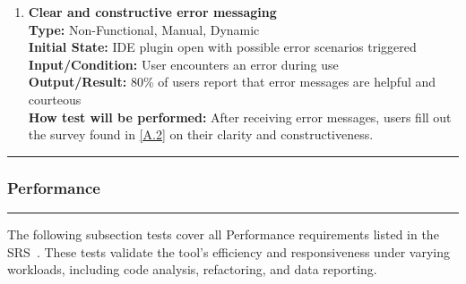 \documentclass[12pt, titlepage]{article}
\newcommand{\colorrule}{\textcolor{BlueViolet}{\rule{\linewidth}{2pt}}}
\begin{document}
\begin{enumerate}[label={\bf \textcolor{Maroon}{test-UH-\arabic*}}, wide=0pt, font=\itshape]
  \item \textbf{Clear and constructive error messaging} \\[2mm]
    \textbf{Type:} Non-Functional, Manual, Dynamic \\
    \textbf{Initial State:} IDE plugin open with possible error scenarios triggered \\
    \textbf{Input/Condition:} User encounters an error during use \\
    \textbf{Output/Result:} 80\% of users report that error messages are helpful and courteous \\[2mm]
    \textbf{How test will be performed:} After receiving error messages, users fill out the survey found in \ref{A.2} on their clarity and constructiveness.
\end{enumerate}

\noindent
\textcolor{Blue}{\colorrule}

\subsubsection{Performance}
\colorrule

\medskip

\noindent
The following subsection tests cover all Performance requirements listed in the SRS~\cite{SRS}. These tests validate the tool’s efficiency and responsiveness under varying workloads, including code analysis, refactoring, and data reporting.
\end{document}
